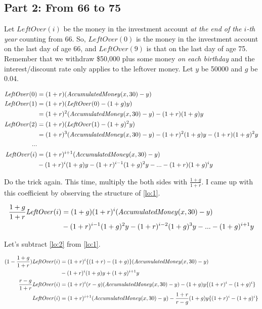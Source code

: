 \documentclass[11pt]{report}
\begin{document}
\subsection*{Part 2: From 66 to 75}
\newcommand{\LeftOver}{\mathit{LeftOver}}

Let $\LeftOver(i)$ be the money in the investment account \emph{at the end of the $i$-th year} counting from 66.
So, $\LeftOver(0)$ is the money in the investment account on the last day of age 66, and $\LeftOver(9)$ is that on the last day of age 75.
Remember that we withdraw \$50,000 plus some money \emph{on each birthday} and the interest/discount rate only applies to the leftover money.
Let $y$ be 50000 and $g$ be 0.04.

\begin{align}
  \LeftOver(0) &= (1+r)(\AccumulatedMoney(x, 30) - y) \\
  \LeftOver(1) &= (1+r)(\LeftOver(0) - (1+g)y) \nonumber \\
  &= (1+r)^2(\AccumulatedMoney(x, 30) - y) - (1+r)(1+g)y \\
  \LeftOver(2) &= (1+r)(\LeftOver(1) - (1+g)^2y) \nonumber \\
               &= (1+r)^3(\AccumulatedMoney(x, 30) - y) - (1+r)^2(1+g)y - (1+r)(1+g)^2y \\
  ... \\
  \LeftOver(i) &= (1+r)^{i+1}(\AccumulatedMoney(x, 30) - y) \nonumber\\
  &- (1+r)^i(1+g)y - (1+r)^{i-1}(1+g)^2y - ... - (1+r)(1+g)^iy \label{lo:1}
\end{align}

Do the trick again. This time, multiply the both sides with $\frac{1+g}{1+r}$. I came up with this coefficient by observing the structure of \eqref{lo:1}.

\begin{align}
  \frac{1+g}{1+r}\LeftOver(i) &= (1+g)(1+r)^i(\AccumulatedMoney(x, 30) - y) \nonumber\\
  &- (1+r)^{i-1}(1+g)^2y - (1+r)^{i-2}(1+g)^3y - ... - (1+g)^{i+1}y \label{lo:2}
\end{align}

Let's subtract \eqref{lo:2} from \eqref{lo:1}.

\begin{align}
  (1-\frac{1+g}{1+r})\LeftOver(i) &= (1+r)^i\{(1+r)-(1+g)\}(\AccumulatedMoney(x, 30) - y) \nonumber \\
  &- (1+r)^i(1+g)y + (1+g)^{i+1}y \nonumber \\
  \frac{r-g}{1+r}\LeftOver(i) &= (1+r)^i(r-g)(\AccumulatedMoney(x, 30) - y) - (1+g)y\{(1+r)^i - (1+g)^i\} \nonumber \\
  \LeftOver(i) &= (1+r)^{i+1}(\AccumulatedMoney(x, 30) - y) - \frac{1+r}{r-g}(1+g)y\{(1+r)^i - (1+g)^i\}\label{lo:3}
\end{align}
\end{document}

